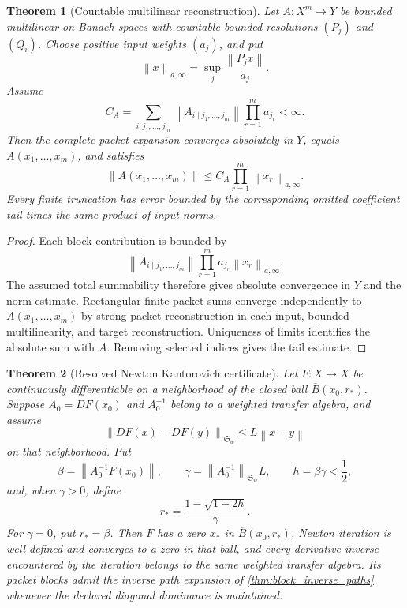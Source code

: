 \documentclass{aomart}
\newtheorem{theorem}{Theorem}[section]
\theoremstyle{definition}
\theoremstyle{remark}
\newcommand{\norm}[1]{\left\lVert#1\right\rVert}
\begin{document}
\begin{theorem}[Countable multilinear reconstruction]\label{thm:countable_multilinear}
Let \(A:X^m\to Y\) be bounded multilinear on Banach spaces with countable bounded resolutions \((P_j)\) and \((Q_i)\). Choose positive input weights \((a_j)\), and put
\[
 \norm{x}_{a,\infty}
 =
 \sup_j\frac{\norm{P_jx}}{a_j}.
\]
Assume
\[
 C_A
 =
 \sum_{i,j_1,\ldots,j_m}
 \norm{A_{i\mid j_1,\ldots,j_m}}
 \prod_{r=1}^ma_{j_r}
 <\infty.
\]
Then the complete packet expansion converges absolutely in \(Y\), equals \(A(x_1,\ldots,x_m)\), and satisfies
\[
 \boxed{
 \norm{A(x_1,\ldots,x_m)}
 \leq
 C_A\prod_{r=1}^m\norm{x_r}_{a,\infty}.
 }
\]
Every finite truncation has error bounded by the corresponding omitted coefficient tail times the same product of input norms.
\end{theorem}

\begin{proof}
Each block contribution is bounded by
\[
 \norm{A_{i\mid j_1,\ldots,j_m}}
 \prod_{r=1}^ma_{j_r}\norm{x_r}_{a,\infty}.
\]
The assumed total summability therefore gives absolute convergence in \(Y\) and the norm estimate. Rectangular finite packet sums converge independently to \(A(x_1,\ldots,x_m)\) by strong packet reconstruction in each input, bounded multilinearity, and target reconstruction. Uniqueness of limits identifies the absolute sum with \(A\). Removing selected indices gives the tail estimate.
\end{proof}

\begin{theorem}[Resolved Newton Kantorovich certificate]\label{thm:resolved_newton}
Let \(F:X\to X\) be continuously differentiable on a neighborhood of the closed ball \(\overline B(x_0,r_*)\). Suppose \(A_0=DF(x_0)\) and \(A_0^{-1}\) belong to a weighted transfer algebra, and assume
\[
 \norm{DF(x)-DF(y)}_{\mathfrak S_w}
 \leq
 L\norm{x-y}
\]
on that neighborhood. Put
\[
 \beta=\norm{A_0^{-1}F(x_0)},
 \qquad
 \gamma=\norm{A_0^{-1}}_{\mathfrak S_w}L,
 \qquad
 h=\beta\gamma<\frac12,
\]
and, when \(\gamma>0\), define
\[
 \boxed{
 r_*
 =
 \frac{1-\sqrt{1-2h}}{\gamma}.
 }
\]
For \(\gamma=0\), put \(r_*=\beta\). Then \(F\) has a zero \(x_*\) in \(\overline B(x_0,r_*)\), Newton iteration is well defined and converges to a zero in that ball, and every derivative inverse encountered by the iteration belongs to the same weighted transfer algebra. Its packet blocks admit the inverse path expansion of \cref{thm:block_inverse_paths} whenever the declared diagonal dominance is maintained.
\end{theorem}
\end{document}
